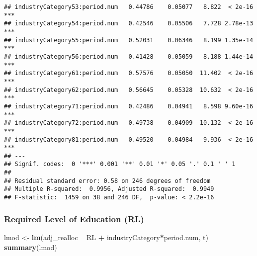 \documentclass[
]{article}
\newenvironment{Shaded}{\begin{snugshade}}{\end{snugshade}}
\newcommand{\KeywordTok}[1]{\textcolor[rgb]{0.13,0.29,0.53}{\textbf{#1}}}
\newcommand{\NormalTok}[1]{#1}
\newcommand{\OperatorTok}[1]{\textcolor[rgb]{0.81,0.36,0.00}{\textbf{#1}}}
\newcommand{\StringTok}[1]{\textcolor[rgb]{0.31,0.60,0.02}{#1}}
\begin{document}
\begin{verbatim}
## industryCategory53:period.num   0.44786    0.05077   8.822  < 2e-16 ***
## industryCategory54:period.num   0.42546    0.05506   7.728 2.78e-13 ***
## industryCategory55:period.num   0.52031    0.06346   8.199 1.35e-14 ***
## industryCategory56:period.num   0.41428    0.05059   8.188 1.44e-14 ***
## industryCategory61:period.num   0.57576    0.05050  11.402  < 2e-16 ***
## industryCategory62:period.num   0.56645    0.05328  10.632  < 2e-16 ***
## industryCategory71:period.num   0.42486    0.04941   8.598 9.60e-16 ***
## industryCategory72:period.num   0.49738    0.04909  10.132  < 2e-16 ***
## industryCategory81:period.num   0.49520    0.04984   9.936  < 2e-16 ***
## ---
## Signif. codes:  0 '***' 0.001 '**' 0.01 '*' 0.05 '.' 0.1 ' ' 1
## 
## Residual standard error: 0.58 on 246 degrees of freedom
## Multiple R-squared:  0.9956, Adjusted R-squared:  0.9949 
## F-statistic:  1459 on 38 and 246 DF,  p-value: < 2.2e-16
\end{verbatim}

\hypertarget{required-level-of-education-rl}{%
\subsubsection{Required Level of Education
(RL)}\label{required-level-of-education-rl}}

\begin{Shaded}
\begin{Highlighting}[]
\NormalTok{lmod <-}\StringTok{ }\KeywordTok{lm}\NormalTok{(adj_realloc }\OperatorTok{~}\StringTok{  }\NormalTok{RL }\OperatorTok{+}\StringTok{ }\NormalTok{industryCategory}\OperatorTok{*}\NormalTok{period.num, t)}
\KeywordTok{summary}\NormalTok{(lmod)}
\end{Highlighting}
\end{Shaded}
\end{document}
